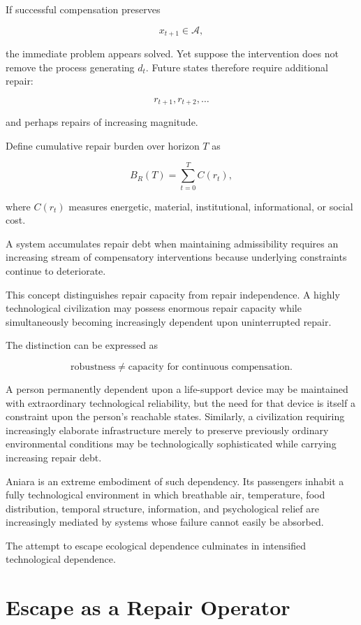 \documentclass[11pt,oneside]{book}
\theoremstyle{definition}
\theoremstyle{remark}
\newcommand{\A}{\mathcal{A}}
\begin{document}
If successful compensation preserves

\[
x_{t+1}\in\A,
\]

the immediate problem appears solved. Yet suppose the intervention does not remove the process generating \(d_t\). Future states therefore require additional repair:

\[
r_{t+1},r_{t+2},\ldots
\]

and perhaps repairs of increasing magnitude.

Define cumulative repair burden over horizon \(T\) as

\[
B_R(T)
=
\sum_{t=0}^{T}
C(r_t),
\]

where \(C(r_t)\) measures energetic, material, institutional, informational, or social cost.

A system accumulates repair debt when maintaining admissibility requires an increasing stream of compensatory interventions because underlying constraints continue to deteriorate.

This concept distinguishes repair capacity from repair independence. A highly technological civilization may possess enormous repair capacity while simultaneously becoming increasingly dependent upon uninterrupted repair.

The distinction can be expressed as

\[
\text{robustness}
\neq
\text{capacity for continuous compensation}.
\]

A person permanently dependent upon a life-support device may be maintained with extraordinary technological reliability, but the need for that device is itself a constraint upon the person's reachable states. Similarly, a civilization requiring increasingly elaborate infrastructure merely to preserve previously ordinary environmental conditions may be technologically sophisticated while carrying increasing repair debt.

Aniara is an extreme embodiment of such dependency. Its passengers inhabit a fully technological environment in which breathable air, temperature, food distribution, temporal structure, information, and psychological relief are increasingly mediated by systems whose failure cannot easily be absorbed.

The attempt to escape ecological dependence culminates in intensified technological dependence.

\section{Escape as a Repair Operator}
\end{document}
